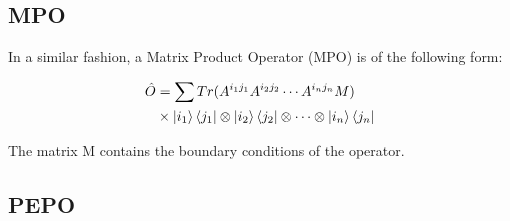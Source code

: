 \subsection{MPO}

In a similar fashion, a Matrix Product Operator (MPO) is of the following form: 

\begin{equation} \label{def_mpo}
\begin{split}
      \hat{O} &= \sum Tr(A^{i_1 j_1} A^{i_2 j_2} \cdots A^{i_n j_n} M) \\
    & \times \ket{i_1}\bra{j_1} \otimes \ket{i_2}\bra{j_2} \otimes \cdots \otimes \ket{i_n}\bra{j_n}
\end{split}
\end{equation} 

The matrix M contains the boundary conditions of the operator.

\subsection{PEPO}